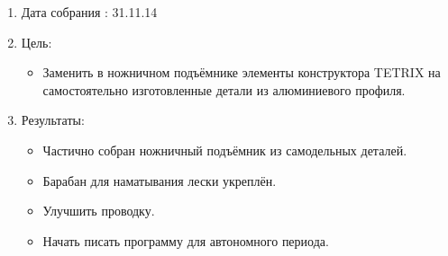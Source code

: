 
	\begin{enumerate}
		\item Дата собрания : 31.11.14
		\item Цель:
		\begin{itemize}
			\item Заменить в ножничном подъёмнике элементы конструктора TETRIX на самостоятельно изготовленные детали из алюминиевого профиля.
	    \end{itemize}
	    \item Результаты:
	    \begin{itemize}
	    	\item Частично собран ножничный подъёмник из самодельных деталей.
	    	\item Барабан для наматывания лески укреплён.
	    \end{itemize}
	    \begin{itemize}
	   	    \item Улучшить проводку.
	   	    \item Начать писать программу для автономного периода.
	   	\end{itemize}
    \end{enumerate}    	
   \fillpage
	    